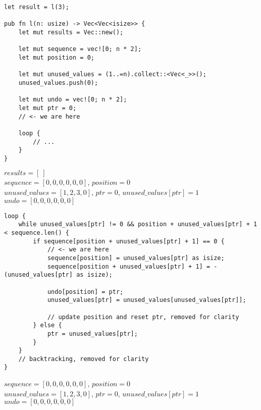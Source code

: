 \begin{frame}[fragile]
    \begin{verbatim}
let result = l(3);

pub fn l(n: usize) -> Vec<Vec<isize>> {
    let mut results = Vec::new();

    let mut sequence = vec![0; n * 2];
    let mut position = 0;

    let mut unused_values = (1..=n).collect::<Vec<_>>();
    unused_values.push(0);

    let mut undo = vec![0; n * 2];
    let mut ptr = 0;
    // <- we are here

    loop {
        // ...
    }
}
    \end{verbatim}
    $results = [\ ]$\\
    $sequence = [0, 0, 0, 0, 0, 0]$, $position = 0$\\
    $unused\_values = [1, 2, 3, 0]$, $ptr = 0$, $unused\_values[ptr] = 1$\\
    $undo = [0, 0, 0, 0, 0, 0]$
\end{frame}
\begin{frame}[fragile]
    \begin{verbatim}
loop {
    while unused_values[ptr] != 0 && position + unused_values[ptr] + 1 < sequence.len() {
        if sequence[position + unused_values[ptr] + 1] == 0 {
            // <- we are here
            sequence[position] = unused_values[ptr] as isize;
            sequence[position + unused_values[ptr] + 1] = -(unused_values[ptr] as isize);

            undo[position] = ptr;
            unused_values[ptr] = unused_values[unused_values[ptr]];
            
            // update position and reset ptr, removed for clarity
        } else {
            ptr = unused_values[ptr];
        }
    }
    // backtracking, removed for clarity
}
    \end{verbatim}
    $sequence = [0, 0, 0, 0, 0, 0]$, $position = 0$\\
    $unused\_values = [1, 2, 3, 0]$, $ptr = 0$, $unused\_values[ptr] = 1$\\
    $undo = [0, 0, 0, 0, 0, 0]$
\end{frame}
